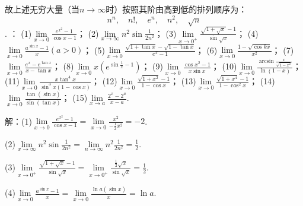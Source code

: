 \documentclass[12pt,UTF8]{ctexart}
\begin{document}
\begin{enumerate}
故上述无穷大量（当$n\rightarrow\infty$时）按照其阶由高到低的排列顺序为：
\[n^n,\quad n!,\quad e^n,\quad n^2,\quad\sqrt n\].
：
\newline
(1)$\lim\limits_{x\rightarrow0}\frac{e^{x^2}-1}{\cos x-1}$；
\newline
(2)$\lim\limits_{x\rightarrow\infty}n^2\sin\frac1{2n^2}$；
\newline
(3)$\lim\limits_{x\rightarrow0^+}\frac{\sqrt{1+\sqrt x}-1}{\sin{\sqrt x}}$；
\newline
(4)$\lim\limits_{x\rightarrow0}\frac{a^{\sin x}-1}x(a>0)$；
\newline
(5)$\lim\limits_{x\rightarrow0}\frac{\sqrt{1+\tan x}-\sqrt{1-\tan x}}{e^x-1}$；
\newline
(6)$\lim\limits_{x\rightarrow0}\frac{1-\sqrt{\cos kx}}{x^2}$；
\newline
(7)$\lim\limits_{x\rightarrow0}\frac{e^x-e^{\tan x}}{x-\tan x}$；
\newline
(8)$\lim\limits_{x\rightarrow0}x(e^{\sin\frac1x-1})$；
\newline
(9)$\lim\limits_{x\rightarrow0}\frac{\cos x^2-1}{x\sin x}$；
\newline
(10)$\lim\limits_{x\rightarrow0}\frac{\arcsin\frac{x}{\sqrt{1-x^2}}}{\ln(1-x)}$；
\newline
(11)$\lim\limits_{x\rightarrow0}\frac{x\tan^4x}{\sin^3x(1-\cos x)}$；
\newline
(12)$\lim\limits_{x\rightarrow0}\frac{\sqrt{1+x^2}-1}{1-\cos x}$；
\newline
(13)$\lim\limits_{x\rightarrow0}\frac{\sqrt{1+x^4}-1}{1-\cos^2x}$；
\newline
(14)$\lim\limits_{x\rightarrow0}\frac{\tan(\sin x)}{\sin(\tan x)}$；
\newline
(15)$\lim\limits_{x\rightarrow a}\frac{2^x-2^a}{x-a}$.

解：(1)$\lim\limits_{x\rightarrow0}\frac{e^{x^2}-1}{\cos x-1}=\lim\limits_{x\rightarrow0}\frac{x^2}{-\frac12x^2}=-2$.

(2)$\lim\limits_{x\rightarrow\infty}n^2\sin\frac1{2n^2}=\lim\limits_{n\rightarrow\infty}n^2\frac1{2n^2}=\frac12$.

(3)$\lim\limits_{x\rightarrow0^+}\frac{\sqrt{1+\sqrt x}-1}{\sin{\sqrt x}}=\lim\limits_{x\rightarrow0^+}\frac{\frac12\sqrt x}{\sin{\sqrt x}}=\frac12$.

(4)$\lim\limits_{x\rightarrow0}\frac{a^{\sin x}-1}x=\lim\limits_{x\rightarrow0}\frac{\ln a(\sin x)}x=\ln a$.


\end{enumerate}
\end{document}
